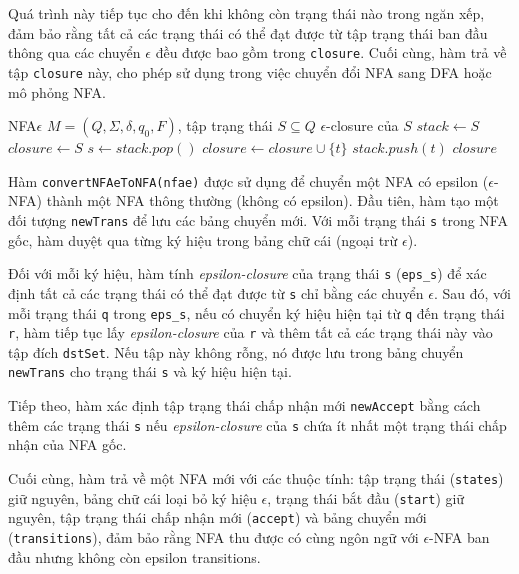 \documentclass[12pt,a4paper]{report}
\begin{document}
Quá trình này tiếp tục cho đến khi không còn trạng thái nào trong ngăn xếp, đảm bảo rằng tất cả các trạng thái có thể đạt được từ tập trạng thái ban đầu thông qua các chuyển \(\epsilon\) đều được bao gồm trong \texttt{closure}. Cuối cùng, hàm trả về tập \texttt{closure} này, cho phép sử dụng trong việc chuyển đổi NFA sang DFA hoặc mô phỏng NFA.
\begin{algorithm}[H]
\caption{Tính $\epsilon$-closure của một tập trạng thái trong NFA$\epsilon$}
\begin{algorithmic}[1]
\Require NFA$\epsilon$ $M = (Q, \Sigma, \delta, q_0, F)$, tập trạng thái $S \subseteq Q$
\Ensure $\epsilon$-closure của $S$
\State $stack \gets S$
\State $closure \gets S$
    \State $s \gets stack.pop()$
                \State $closure \gets closure \cup \{t\}$
                \State $stack.push(t)$
            \EndIf
        \EndFor
    \EndIf
\EndWhile
\State \Return $closure$
\end{algorithmic}
\end{algorithm}


Hàm \texttt{convertNFAeToNFA(nfae)} được sử dụng để chuyển một NFA có epsilon (\(\epsilon\)-NFA) thành một NFA thông thường (không có epsilon). Đầu tiên, hàm tạo một đối tượng \texttt{newTrans} để lưu các bảng chuyển mới. Với mỗi trạng thái \texttt{s} trong NFA gốc, hàm duyệt qua từng ký hiệu trong bảng chữ cái (ngoại trừ \(\epsilon\)).  

Đối với mỗi ký hiệu, hàm tính \emph{epsilon-closure} của trạng thái \texttt{s} (\texttt{eps\_s}) để xác định tất cả các trạng thái có thể đạt được từ \texttt{s} chỉ bằng các chuyển \(\epsilon\). Sau đó, với mỗi trạng thái \texttt{q} trong \texttt{eps\_s}, nếu có chuyển ký hiệu hiện tại từ \texttt{q} đến trạng thái \texttt{r}, hàm tiếp tục lấy \emph{epsilon-closure} của \texttt{r} và thêm tất cả các trạng thái này vào tập đích \texttt{dstSet}. Nếu tập này không rỗng, nó được lưu trong bảng chuyển \texttt{newTrans} cho trạng thái \texttt{s} và ký hiệu hiện tại.  

Tiếp theo, hàm xác định tập trạng thái chấp nhận mới \texttt{newAccept} bằng cách thêm các trạng thái \texttt{s} nếu \emph{epsilon-closure} của \texttt{s} chứa ít nhất một trạng thái chấp nhận của NFA gốc.  

Cuối cùng, hàm trả về một NFA mới với các thuộc tính: tập trạng thái (\texttt{states}) giữ nguyên, bảng chữ cái loại bỏ ký hiệu \(\epsilon\), trạng thái bắt đầu (\texttt{start}) giữ nguyên, tập trạng thái chấp nhận mới (\texttt{accept}) và bảng chuyển mới (\texttt{transitions}), đảm bảo rằng NFA thu được có cùng ngôn ngữ với \(\epsilon\)-NFA ban đầu nhưng không còn epsilon transitions.
\end{document}
